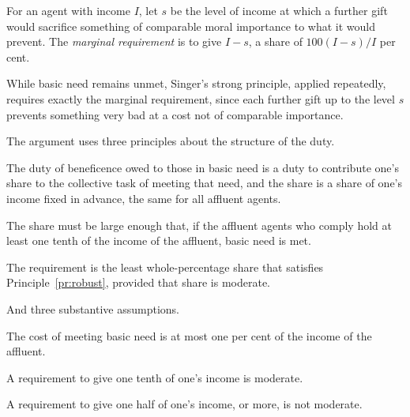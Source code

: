 \documentclass{situationist-preprint}
\begin{document}
\begin{definition}\label{d:marginal}
For an agent with income $I$, let $s$ be the level of income at which a further gift would sacrifice something of comparable moral importance to what it would prevent. The \emph{marginal requirement} is to give $I - s$, a share of $100(I-s)/I$ per cent.
\end{definition}

While basic need remains unmet, Singer's strong principle, applied repeatedly, requires exactly the marginal requirement, since each further gift up to the level $s$ prevents something very bad at a cost not of comparable importance.

The argument uses three principles about the structure of the duty.

\begin{principle}\label{pr:task}
The duty of beneficence owed to those in basic need is a duty to contribute one's share to the collective task of meeting that need, and the share is a share of one's income fixed in advance, the same for all affluent agents.
\end{principle}

\begin{principle}[Robustness]\label{pr:robust}
The share must be large enough that, if the affluent agents who comply hold at least one tenth of the income of the affluent, basic need is met.
\end{principle}

\begin{principle}\label{pr:least}
The requirement is the least whole-percentage share that satisfies Principle~\ref{pr:robust}, provided that share is moderate.
\end{principle}

And three substantive assumptions.

\begin{assumption}\label{a:need}
The cost of meeting basic need is at most one per cent of the income of the affluent.
\end{assumption}

\begin{assumption}\label{a:tenth}
A requirement to give one tenth of one's income is moderate.
\end{assumption}

\begin{assumption}\label{a:half}
A requirement to give one half of one's income, or more, is not moderate.
\end{assumption}
\end{document}
